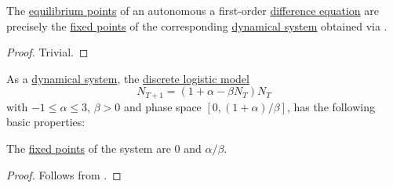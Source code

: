 \begin{proposition}\label{thm:difference_equation_fixed_points}
  The \hyperref[def:difference_equation_equilibrium_point]{equilibrium points} of an autonomous a first-order \hyperref[def:difference_equation]{difference equation} are precisely the \hyperref[def:dynamical_system_fixed_point]{fixed points} of the corresponding \hyperref[def:dynamical_system]{dynamical system} obtained via .
\end{proposition}
\begin{proof}
  Trivial.
\end{proof}

\begin{proposition}\label{thm:discrete_logistic_model_dynamics}
  As a \hyperref[def:dynamical_system]{dynamical system}, the \hyperref[def:discrete_logistic_model]{discrete logistic model}
  \begin{equation*}
    N_{T+1} = (1 + \alpha - \beta N_T) N_T
  \end{equation*}
  with \( -1 \leq \alpha \leq 3 \), \( \beta > 0 \) and phase space \( [0, (1 + \alpha) / \beta] \), has the following basic properties:
  \begin{thmenum}
     The \hyperref[def:dynamical_system_fixed_point]{fixed points} of the system are \( 0 \) and \( \alpha / \beta \).
  \end{thmenum}
\end{proposition}
\begin{proof}
   Follows from .
\end{proof}
